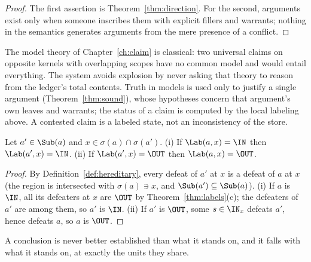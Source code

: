 \begin{proof}
The first assertion is Theorem~\ref{thm:direction}. For the second, arguments exist only when someone inscribes them with explicit fillers and warrants; nothing in the semantics generates arguments from the mere presence of a conflict.
\end{proof}

\begin{remark}
The model theory of Chapter~\ref{ch:claim} is classical: two universal claims on opposite kernels with overlapping scopes have no common model and would entail everything. The system avoids explosion by never asking that theory to reason from the ledger's total contents. Truth in models is used only to justify a single argument (Theorem~\ref{thm:sound}), whose hypotheses concern that argument's own leaves and warrants; the status of a claim is computed by the local labeling above. A contested claim is a labeled state, not an inconsistency of the store.
\end{remark}

\begin{lemma}\label{lem:hereditary}
Let $a'\in\Sub(a)$ and $x\in\sigma(a)\cap\sigma(a')$. (i) If $\Lab(a,x)=\IN$ then $\Lab(a',x)=\IN$. (ii) If $\Lab(a',x)=\OUT$ then $\Lab(a,x)=\OUT$.
\end{lemma}

\begin{proof}
By Definition~\ref{def:hereditary}, every defeat of $a'$ at $x$ is a defeat of $a$ at $x$ (the region is intersected with $\sigma(a)\ni x$, and $\Sub(a')\subseteq\Sub(a)$). (i) If $a$ is $\IN$, all its defeaters at $x$ are $\OUT$ by Theorem~\ref{thm:labels}(c); the defeaters of $a'$ are among them, so $a'$ is $\IN$. (ii) If $a'$ is $\OUT$, some $s\in\IN_x$ defeats $a'$, hence defeats $a$, so $a$ is $\OUT$.
\end{proof}

A conclusion is never better established than what it stands on, and it falls with what it stands on, at exactly the units they share.
